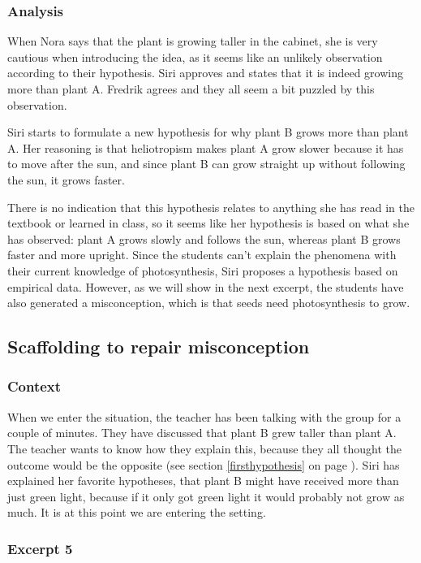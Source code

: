 \subsubsection*{Analysis}
When Nora says that the plant is growing taller in the cabinet, she is very cautious when introducing the idea, as it seems like an unlikely observation according to their hypothesis. Siri approves and states that it is indeed growing more than plant A. Fredrik agrees and they all seem a bit puzzled by this observation.

Siri starts to formulate a new hypothesis for why plant B grows more than plant A. Her reasoning is that heliotropism makes plant A grow slower because it has to move after the sun, and since plant B can grow straight up without following the sun, it grows faster. 

There is no indication that this hypothesis relates to anything she has read in the textbook or learned in class, so it seems like her hypothesis is based on what she has observed: plant A grows slowly and follows the sun, whereas plant B grows faster and more upright. Since the students can't explain the phenomena with their current knowledge of photosynthesis, Siri proposes a hypothesis based on empirical data. However, as we will show in the next excerpt, the students have also generated a misconception, which is that seeds need photosynthesis to grow.


\subsection{Scaffolding to repair misconception}

\subsubsection*{Context}
When we enter the situation, the teacher has been talking with the group for a couple of minutes. They have discussed that plant B grew taller than plant A. The teacher wants to know how they explain this, because they all thought the outcome would be the opposite (see section \ref{firsthypothesis} on page \pageref{firsthypothesis}). Siri has explained her favorite hypotheses, that plant B might have received more than just green light, because if it only got green light it would probably not grow as much.  It is at this point we are entering the setting.
 
\subsubsection*{Excerpt 5}\label{ex:excerpt5}

